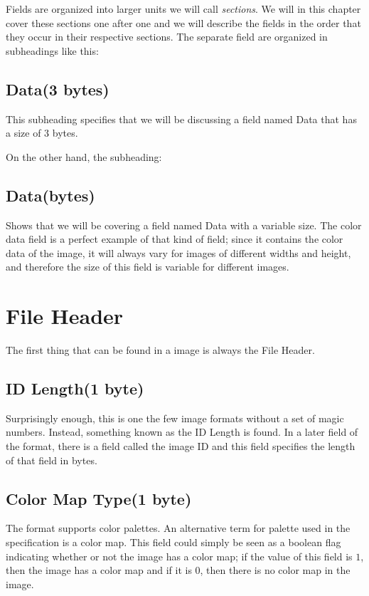 \newcommand{\plural}[3]{\ifstrequal{#1}{1}{#2}{#3}}
\newcommand{\fieldlength}[1]{\ifstrequal{#1}{0}{bytes}{#1 \plural{#1}{byte}{bytes}}}
\newcommand{\imgfield}[2]{\subsection*{#1(\fieldlength{#2})}}
\newcommand{\imgsubfield}[2]{\subsubsection*{#1(\fieldlength{#2})}}

Fields are organized into larger units we will call
\textit{sections}. We will in this chapter cover these sections one
after one and we will describe the fields in the order that they occur
in their respective sections. The separate field are organized in
subheadings like this:

\imgfield{Data}{3}

This subheading specifies that we will be discussing a field named
Data that has a size of 3 bytes.

On the other hand, the subheading:

\imgfield{Data}{0}

Shows that we will be covering a field named Data with a variable
size. The color data field is a perfect example of that kind of field;
since it contains the color data of the image, it will always vary for
images of different widths and height, and therefore the size of this
field is variable for different images.

\section{File Header}

The first thing that can be found in a \tga image is always the File
Header.

\imgfield{ID Length}{1}

Surprisingly enough, this is one the few image formats without a set
of magic numbers. Instead, something known as the ID Length is
found. In a later field of the format, there is a field called the
image ID and this field specifies the length of that field in bytes.

\imgfield{Color Map Type}{1}

The \tga format supports color palettes. An alternative term for
palette used in the \tga specification is a color map. This field
could simply be seen as a boolean flag indicating whether or not the
image has a color map; if the value of this field is $1$, then the
image has a color map and if it is $0$, then there is no color map in
the image.

